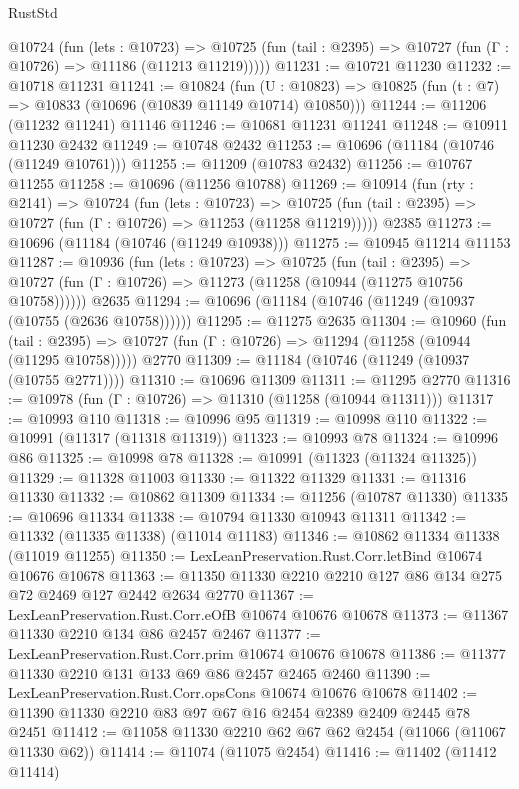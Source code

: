 \begin{lexlean}{RustStd}
\begin{coremodule}
    @10724
      (fun (lets : @10723) =>
      @10725 (fun (tail : @2395) => @10727 (fun (Γ : @10726) => @11186 (@11213 @11219)))))
@11231 := @10721 @11230
@11232 := @10718 @11231
@11241 := @10824
    (fun (U : @10823) => @10825 (fun (t : @7) => @10833 (@10696 (@10839 @11149 @10714) @10850)))
@11244 := @11206 (@11232 @11241) @11146
@11246 := @10681 @11231 @11241
@11248 := @10911 @11230 @2432
@11249 := @10748 @2432
@11253 := @10696 (@11184 (@10746 (@11249 @10761)))
@11255 := @11209 (@10783 @2432)
@11256 := @10767 @11255
@11258 := @10696 (@11256 @10788)
@11269 := @10914
    (fun (rty : @2141) =>
    @10724
      (fun (lets : @10723) =>
      @10725 (fun (tail : @2395) => @10727 (fun (Γ : @10726) => @11253 (@11258 @11219)))))
    @2385
@11273 := @10696 (@11184 (@10746 (@11249 @10938)))
@11275 := @10945 @11214 @11153
@11287 := @10936
    (fun (lets : @10723) =>
    @10725
      (fun (tail : @2395) =>
      @10727 (fun (Γ : @10726) => @11273 (@11258 (@10944 (@11275 @10756 @10758))))))
    @2635
@11294 := @10696 (@11184 (@10746 (@11249 (@10937 (@10755 (@2636 @10758))))))
@11295 := @11275 @2635
@11304 := @10960
    (fun (tail : @2395) => @10727 (fun (Γ : @10726) => @11294 (@11258 (@10944 (@11295 @10758)))))
    @2770
@11309 := @11184 (@10746 (@11249 (@10937 (@10755 @2771))))
@11310 := @10696 @11309
@11311 := @11295 @2770
@11316 := @10978 (fun (Γ : @10726) => @11310 (@11258 (@10944 @11311)))
@11317 := @10993 @110
@11318 := @10996 @95
@11319 := @10998 @110
@11322 := @10991 (@11317 (@11318 @11319))
@11323 := @10993 @78
@11324 := @10996 @86
@11325 := @10998 @78
@11328 := @10991 (@11323 (@11324 @11325))
@11329 := @11328 @11003
@11330 := @11322 @11329
@11331 := @11316 @11330
@11332 := @10862 @11309
@11334 := @11256 (@10787 @11330)
@11335 := @10696 @11334
@11338 := @10794 @11330 @10943 @11311
@11342 := @11332 (@11335 @11338) (@11014 @11183)
@11346 := @10862 @11334 @11338 (@11019 @11255)
@11350 := LexLeanPreservation.Rust.Corr.letBind @10674 @10676 @10678
@11363 := @11350 @11330 @2210 @2210 @127 @86 @134 @275 @72 @2469 @127 @2442 @2634 @2770
@11367 := LexLeanPreservation.Rust.Corr.eOfB @10674 @10676 @10678
@11373 := @11367 @11330 @2210 @134 @86 @2457 @2467
@11377 := LexLeanPreservation.Rust.Corr.prim @10674 @10676 @10678
@11386 := @11377 @11330 @2210 @131 @133 @69 @86 @2457 @2465 @2460
@11390 := LexLeanPreservation.Rust.Corr.opsCons @10674 @10676 @10678
@11402 := @11390 @11330 @2210 @83 @97 @67 @16 @2454 @2389 @2409 @2445 @78 @2451
@11412 := @11058 @11330 @2210 @62 @67 @62 @2454 (@11066 (@11067 @11330 @62))
@11414 := @11074 (@11075 @2454)
@11416 := @11402 (@11412 @11414)

\end{coremodule}
\end{lexlean}
